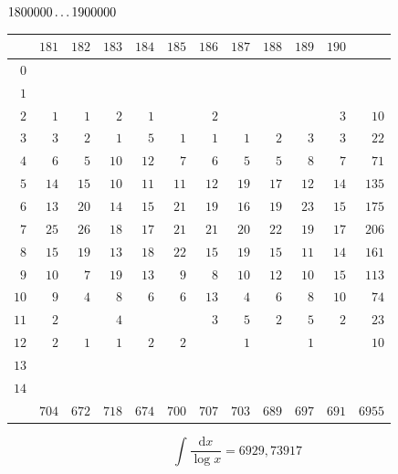 \clearpage
\noindent\begin{minipage}{\linewidth}\centering
{}
\(1800000\mathinner{.\,.\,.}1900000\)\par\smallskip
\begingroup\fontsize{10.5}{11.5}\selectfont\setlength{\tabcolsep}{3.5pt}\renewcommand{\arraystretch}{1}
\begin{tabular}{r|rrrrrrrrrr|r}\hline
 & $181$ & $182$ & $183$ & $184$ & $185$ & $186$ & $187$ & $188$ & $189$ & $190$ &  \\ \hline
$0$ &  &  &  &  &  &  &  &  &  &  &  \\
$1$ &  &  &  &  &  &  &  &  &  &  &  \\
$2$ & $1$ & $1$ & $2$ & $1$ &  & $2$ &  &  &  & $3$ & $10$ \\
$3$ & $3$ & $2$ & $1$ & $5$ & $1$ & $1$ & $1$ & $2$ & $3$ & $3$ & $22$ \\
$4$ & $6$ & $5$ & $10$ & $12$ & $7$ & $6$ & $5$ & $5$ & $8$ & $7$ & $71$ \\
$5$ & $14$ & $15$ & $10$ & $11$ & $11$ & $12$ & $19$ & $17$ & $12$ & $14$ & $135$ \\
$6$ & $13$ & $20$ & $14$ & $15$ & $21$ & $19$ & $16$ & $19$ & $23$ & $15$ & $175$ \\
$7$ & $25$ & $26$ & $18$ & $17$ & $21$ & $21$ & $20$ & $22$ & $19$ & $17$ & $206$ \\
$8$ & $15$ & $19$ & $13$ & $18$ & $22$ & $15$ & $19$ & $15$ & $11$ & $14$ & $161$ \\
$9$ & $10$ & $7$ & $19$ & $13$ & $9$ & $8$ & $10$ & $12$ & $10$ & $15$ & $113$ \\
$10$ & $9$ & $4$ & $8$ & $6$ & $6$ & $13$ & $4$ & $6$ & $8$ & $10$ & $74$ \\
$11$ & $2$ &  & $4$ &  &  & $3$ & $5$ & $2$ & $5$ & $2$ & $23$ \\
$12$ & $2$ & $1$ & $1$ & $2$ & $2$ &  & $1$ &  & $1$ &  & $10$ \\
$13$ &  &  &  &  &  &  &  &  &  &  &  \\
$14$ &  &  &  &  &  &  &  &  &  &  &  \\
\hline
 & $704$ & $672$ & $718$ & $674$ & $700$ & $707$ & $703$ & $689$ & $697$ & $691$ & $6955$ \\ \hline
\end{tabular}\par\endgroup
\setlength{\abovedisplayskip}{6pt}\setlength{\belowdisplayskip}{4pt}
\[\int\frac{\mathrm{d}x}{\log x}=6929{,}73917\]
\end{minipage}

